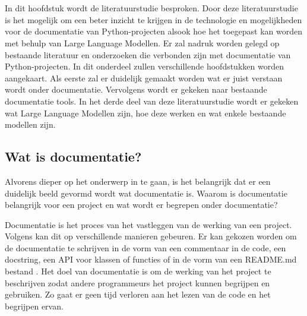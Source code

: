 \chapter{}%
\label{ch:stand-van-zaken}



In dit hoofdstuk wordt de literatuurstudie besproken. 
Door deze literatuurstudie is het mogelijk om een beter inzicht te krijgen in de technologie en mogelijkheden voor de documentatie van Python-projecten alsook hoe het toegepast kan worden met behulp van Large Language Modellen. 
Er zal nadruk worden gelegd op bestaande literatuur en onderzoeken die verbonden zijn met documentatie van Python-projecten. 
In dit onderdeel zullen verschillende hoofdstukken worden aangekaart. 
Als eerste zal er duidelijk gemaakt worden wat er juist verstaan wordt onder documentatie. 
Vervolgens wordt er gekeken naar bestaande documentatie tools.
In het derde deel van deze literatuurstudie wordt er gekeken wat Large Language Modellen zijn, hoe deze werken en wat enkele bestaande modellen zijn.

\section{Wat is documentatie?}
\label{sec:wat-is-documentatie}

Alvorens dieper op het onderwerp in te gaan, is het belangrijk dat er een duidelijk beeld gevormd wordt wat documentatie is. 
Waarom is documentatie belangrijk voor een project en wat wordt er begrepen onder documentatie? 

Documentatie is het proces van het vastleggen van de werking van een project.
Volgens \textcite{CodeQuality2024} kan dit op verschillende manieren gebeuren. 
Er kan gekozen worden om de documentatie te schrijven in de vorm van een commentaar in de code, een docstring, een API voor klassen of functies of in de vorm van een README.md bestand \autocite{CodeQuality2024}.
Het doel van documentatie is om de werking van het project te beschrijven zodat andere programmeurs het project kunnen begrijpen en gebruiken.
Zo gaat er geen tijd verloren aan het lezen van de code en het begrijpen ervan.

